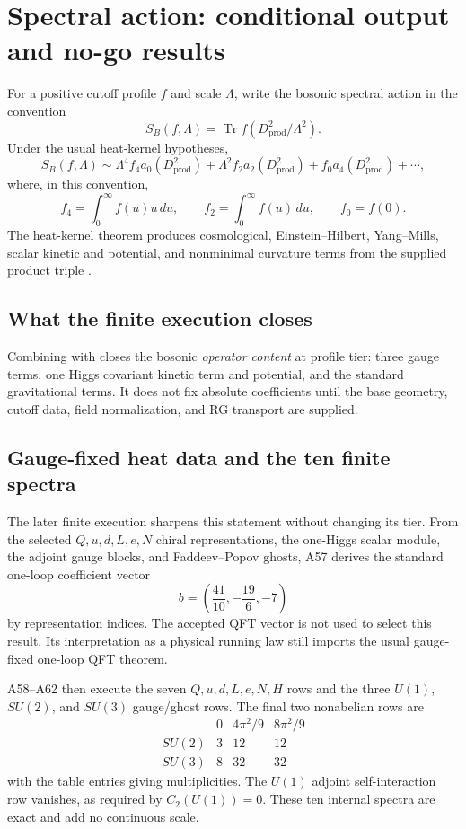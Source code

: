 \documentclass[11pt,a4paper,twoside]{article}
\theoremstyle{plain}
\theoremstyle{definition}
\theoremstyle{remark}
\newcommand{\Tr}{\operatorname{Tr}}
\begin{document}
\section{Spectral action: conditional output and no-go results}

For a positive cutoff profile $f$ and scale $\Lambda$, write the bosonic
spectral action in the convention
\[
 S_B(f,\Lambda)=\Tr f(D_{\mathrm{prod}}^2/\Lambda^2).
\]
Under the usual heat-kernel hypotheses,
\[
 S_B(f,\Lambda)
 \sim \Lambda^4 f_4 a_0(D_{\mathrm{prod}}^2)
     +\Lambda^2 f_2 a_2(D_{\mathrm{prod}}^2)
     +f_0 a_4(D_{\mathrm{prod}}^2)+\cdots,
\]
where, in this convention,
\[
 f_4=\int_0^\infty f(u)u\,du,\qquad
 f_2=\int_0^\infty f(u)\,du,\qquad
 f_0=f(0).
\]
The heat-kernel theorem produces cosmological, Einstein--Hilbert,
Yang--Mills, scalar kinetic and potential, and nonminimal curvature terms
from the supplied product triple
\cite{ChamseddineConnes1997,Vassilevich2003}.

\subsection{What the finite execution closes}

Combining  with  closes the bosonic
\emph{operator content} at profile tier: three gauge terms, one Higgs
covariant kinetic term and potential, and the standard gravitational terms.
It does not fix absolute coefficients until the base geometry, cutoff data,
field normalization, and RG transport are supplied.

\subsection{Gauge-fixed heat data and the ten finite spectra}

The later finite execution sharpens this statement without changing its
tier.  From the selected $Q,u,d,L,e,N$ chiral representations, the one-Higgs
scalar module, the adjoint gauge blocks, and Faddeev--Popov ghosts, A57 derives
the standard one-loop coefficient vector
\[
  b=\left(\frac{41}{10},-\frac{19}{6},-7\right)
\]
by representation indices.  The accepted QFT vector is not used to select
this result.  Its interpretation as a physical running law still imports the
usual gauge-fixed one-loop QFT theorem.

A58--A62 then execute the seven $Q,u,d,L,e,N,H$ rows and the three
$U(1)$, $SU(2)$, and $SU(3)$ gauge/ghost rows.  The final two nonabelian rows
are
\[
\begin{array}{c|ccc}
 &0&4\pi^2/9&8\pi^2/9\\ \hline
 SU(2)&3&12&12\\
 SU(3)&8&32&32
\end{array}
\]
with the table entries giving multiplicities.  The $U(1)$ adjoint
self-interaction row vanishes, as required by $C_2(U(1))=0$.  These ten
internal spectra are exact and add no continuous scale.
\end{document}
